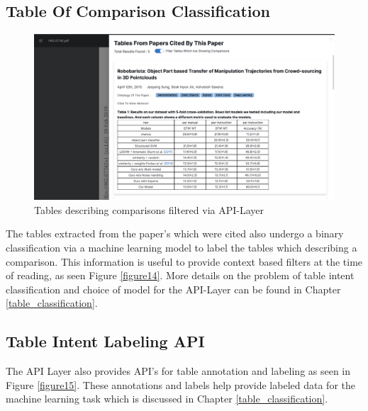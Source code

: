 \subsection{Table Of Comparison Classification}
\begin{figure}[h]
    \centering
    \includegraphics[width=\maxwidth{\textwidth}]{src/images/classification_exp.png}
    \caption{Tables describing comparisons filtered via API-Layer}
    \label{figure\arabic{figurecounter}}
\end{figure}

The tables extracted from the paper's which were cited also undergo a binary classification via a machine learning model to label the tables which describing a comparison. This information is useful to provide context based filters at the time of reading, as seen Figure \ref{figure14}. More details on the problem of table intent classification and choice of model for the API-Layer can be found in Chapter \ref{table_classification}.
 
\subsection{Table Intent Labeling API}
The API Layer also provides API's for table annotation and labeling as seen in Figure \ref{figure15}. These annotations and labels help provide labeled data for the machine learning task which is discussed in Chapter \ref{table_classification}.

